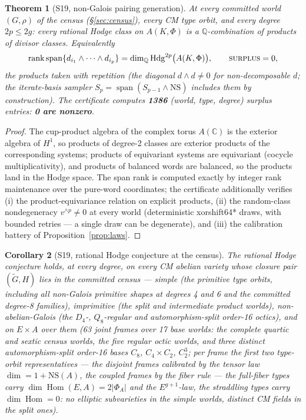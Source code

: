 \documentclass[11pt]{article}
\newtheorem{theorem}{Theorem}[section]
\newtheorem{corollary}[theorem]{Corollary}
\begin{document}
\begin{theorem}[S19, non-Galois pairing generation]\label{thm:s19}
At every committed world $(G,\rho)$ of the census
(\S\ref{sec:census}), every CM type orbit, and every degree $2p\le 2g$:
every rational Hodge class on $A(K,\Phi)$ is a $\mathbb Q$-combination of
\emph{products of divisor classes}. Equivalently
\[
\operatorname{rank}\operatorname{span}\{d_{i_1}\wedge\dots\wedge d_{i_p}\}
=\dim_{\mathbb Q}\operatorname{Hdg}^{2p}\!\big(A(K,\Phi)\big),
\qquad\textsc{surplus}=0,
\]
the products taken with repetition (the diagonal $d\wedge d\ne0$ for
non-decomposable $d$; the iterate-basis sampler
$S_p=\operatorname{span}(S_{p-1}\wedge \mathrm{NS})$ includes them by
construction). The certificate computes \textbf{1386} (world, type,
degree) surplus entries: \textbf{0 are nonzero}.
\end{theorem}

\begin{proof}
The cup-product algebra of the complex torus $A(\mathbb C)$ is the exterior
algebra of $H^1$, so products of degree-2 classes are exterior products of
the corresponding systems; products of equivariant systems are equivariant
(cocycle multiplicativity), and products of balanced words are balanced, so
the products land in the Hodge space. The span rank is computed exactly by
integer rank maintenance over the pure-word coordinates; the certificate
additionally verifies (i) the product-equivariance relation on explicit
products, (ii) the random-class nondegeneracy
$v^{\wedge p}\ne0$ at every world (deterministic xorshift64* draws, with
bounded retries --- a single draw can be degenerate), and (iii) the
calibration battery of Proposition~\ref{prop:laws}.
\end{proof}

\begin{corollary}[S19, rational Hodge conjecture at the census]\label{cor:s19}
The rational Hodge conjecture holds, at every degree, on every CM abelian
variety whose closure pair $(\widetilde G,H)$ lies in the committed census
--- simple (the primitive type orbits, including all non-Galois primitive
shapes at degrees 4 and 6 and the committed degree-8 families), imprimitive
(the split and intermediate product worlds), non-abelian-Galois (the
$D_4$-, $Q_8$-regular and automorphism-split order-16 octics), and on
$E\times A$ over them (63 joint frames over 17 base worlds: the complete
quartic and sextic census worlds, the five regular octic worlds, and three
distinct automorphism-split order-16 bases $C_8$, $C_4\times C_2$,
$C_2^3$; per frame the first two type-orbit representatives --- the disjoint
frames calibrated by the tensor law $\dim=1+\mathrm{NS}(A)$, the coupled
frames by the fiber rule --- the full-fiber types carry
$\dim\operatorname{Hom}(E,A)=2|\Phi_A|$ and the $E^{g+1}$-law, the
straddling types carry $\dim\operatorname{Hom}=0$: no elliptic subvarieties
in the simple worlds, distinct CM fields in the split ones).
\end{corollary}
\end{document}
